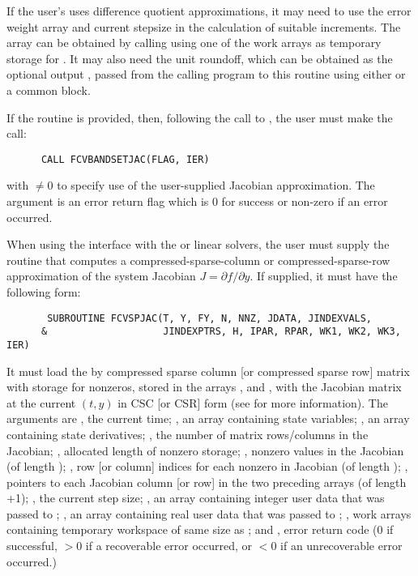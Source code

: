 \begin{Steps}
  If the user's  uses difference quotient approximations, it
  may need to use the error weight array  and current stepsize 
  in the calculation of suitable increments.  The array  can be
  obtained by calling  using one of the work arrays as
  temporary storage for .  It may also need the unit roundoff,
  which can be obtained as the optional output , passed from
  the calling program to this routine using either  or a common block.

  If the  routine is provided, then, following the call to , 
  the user must make the call:
\begin{verbatim}
      CALL FCVBANDSETJAC(FLAG, IER)
\end{verbatim}
  with  $\neq 0$ to specify use of the user-supplied Jacobian approximation.
  The argument  is an error return flag which is $0$ 
  for success or non-zero if an error occurred. \\

  
  When using the {\cvls} interface with the {\sunlinsolklu} or
  {\sunlinsolslumt} linear solvers, the user must 
  supply the  routine that computes a
  compressed-sparse-column or compressed-sparse-row 
  approximation of the system Jacobian $J = \partial f / \partial y$.
  If supplied, it must have the following form:
\begin{verbatim}
       SUBROUTINE FCVSPJAC(T, Y, FY, N, NNZ, JDATA, JINDEXVALS, 
      &                    JINDEXPTRS, H, IPAR, RPAR, WK1, WK2, WK3, IER)
\end{verbatim}
  It must load the  by  compressed sparse column [or
  compressed sparse row] matrix with storage for  nonzeros,
  stored in the arrays ,  and
  , with the Jacobian matrix at the current $(t, y)$ in
  CSC [or CSR] form (see  for more
  information).  The arguments are , the current time; , an
  array containing state variables; , an array containing state
  derivatives; , the number of matrix rows/columns in the
  Jacobian; , allocated length of nonzero storage; ,
  nonzero values in the Jacobian (of length );
  , row [or column] indices for each nonzero in
  Jacobian (of length ); , pointers to each
  Jacobian column [or row] in the two preceding arrays (of length
  +1); , the current step size; , an array
  containing integer user data that was passed to ;
  , an array containing real user data that was passed to
  ; , work arrays containing temporary workspace 
  of same size as ; and , error return code (0 if successful,
  $>0$ if a recoverable error occurred, or $<0$ if an unrecoverable
  error occurred.) 


\end{Steps}
